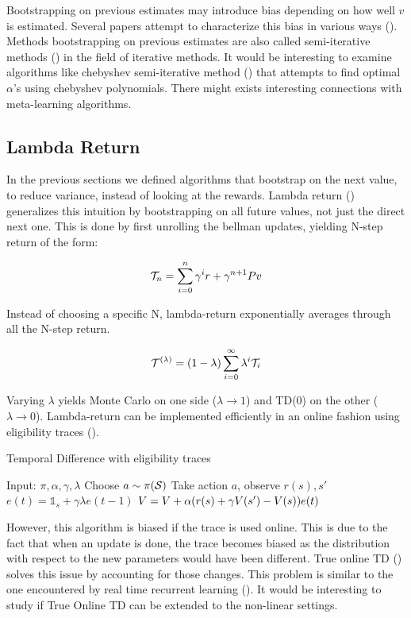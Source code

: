 Bootstrapping on previous estimates may introduce bias depending on how well $v$ is estimated. Several papers attempt to characterize this bias in various ways (\citep{kearns2000bias,sutton1994step}). Methods bootstrapping on previous estimates are also called semi-iterative methods (\citep{varga2009matrix}) in the field of iterative methods. It would be interesting to examine algorithms like chebyshev semi-iterative method (\citep{golub1961chebyshev}) that attempts to find optimal $\alpha$'s using chebyshev polynomials. There might exists interesting connections with meta-learning algorithms.
\subsection{Lambda Return}
In the previous sections we defined algorithms that bootstrap on the next value, to reduce variance, instead of looking at the rewards. Lambda return (\citep{sutton1984temporal}) generalizes this intuition by bootstrapping on all future values, not just the direct next one. This is done by first unrolling the bellman updates, yielding N-step return of the form:
\begin{definition}
\begin{equation}
    \mathcal{T}_{n} = \sum_{i=0}^{n} \gamma^i r + \gamma^{n+1} Pv
\end{equation}
\end{definition}
Instead of choosing a specific N, lambda-return exponentially averages through all the N-step return.
\begin{definition}
\begin{equation}
    \mathcal{T}^{(\lambda)} = (1-\lambda) \sum_{i=0}^{\infty} \lambda^i \mathcal{T}_{i}
\end{equation}
\end{definition}

Varying $\lambda$ yields Monte Carlo on one side ($\lambda \rightarrow 1$) and TD(0) on the other ($\lambda \rightarrow 0$).
Lambda-return can be implemented efficiently in an online fashion using eligibility traces (\citep{sutton1984temporal,singh1996reinforcement,precup2000eligibility}).\\
\begin{algorithm}[H]
\caption{Temporal Difference with eligibility traces}
\begin{algorithmic}[1]
    \STATE Input: $\pi,\alpha,\gamma,\lambda$
        \STATE Choose $a \sim \pi(\mathcal{S})$
        \STATE Take action $a$, observe $r(s),s'$
        \STATE $e(t) =  \mathbb{1}_{s}+ \gamma \lambda e(t-1)$
        \STATE $V = V + \alpha (r(s) + \gamma V(s')-V(s)) e(t)$
    \ENDFOR
\end{algorithmic}
\label{alg:eligibility_traces}
\end{algorithm}
However, this algorithm is biased if the trace is used online. This is due to the fact that when an update is done, the trace becomes biased as the distribution with respect to the new parameters would have been different. True online TD (\citep{seijen2014true}) solves this issue by accounting for those changes. This problem is similar to the one encountered by real time recurrent learning (\citep{williams1995gradient}). It would be interesting to study if True Online TD can be extended to the non-linear settings. 
